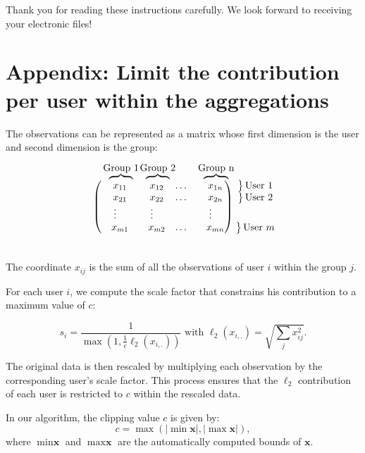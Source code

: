 \documentclass[letterpaper]{article} %
\newcommand\coolover[2]{\mathrlap{\smash{\overbrace{\phantom{%
    \begin{matrix} #2 \end{matrix}}}^{\mbox{$#1$}}}}#2}
\newcommand\coolrightbrace[2]{%
\left.\vphantom{\begin{matrix} #1 \end{matrix}}\right\}#2}
\begin{document}
\bigskip
\noindent Thank you for reading these instructions carefully. We look forward to receiving your electronic files!

% 


\appendix
\section{Appendix: Limit the contribution per user within the aggregations}
\label{sec:limit_contrib_per_user}

The observations can be represented as a matrix whose first dimension is the user
and second dimension is the group:

\[ \vphantom{%
    \begin{matrix}
    \overbrace{XYZ}^{\mbox{$R$}}\\ \\ \\ \\ \\ \\
    \end{matrix}}%
\begin{pmatrix}
    \coolover{\text{Group 1}}{~~~x_{11}} & \coolover{\text{Group 2}}{~~~x_{12}} & \hdots & \coolover{\text{Group n}}{~~~x_{1n}} \\
    ~~~x_{21} & ~~~x_{22} & \hdots & ~~~x_{2n}  \\
    \vdots & \vdots &  & \vdots  \\
    ~~~x_{m1} & ~~~x_{m2} & \hdots & ~~~x_{mn}
\end{pmatrix}%
\begin{matrix}%
    \coolrightbrace{x}{\text{User 1}}\\
    \coolrightbrace{x}{\text{User 2}}\\
    \vphantom{\vdots} \\
    \coolrightbrace{x}{\text{User }m}\\
\end{matrix}
\]

The coordinate $x_{ij}$ is the sum of all the observations of user $i$ within the group $j$.


For each user $i$, we compute the scale factor that constrains his contribution to a maximum value of $c$:

\begin{equation}
	s_i = \frac{1}{\max ( 1, \frac{1}{c} \ell_2(x_{i,.}) )} \text{  with  } \ell_2(x_{i,.}) = \sqrt{\sum_j x^2_{ij}}.
\end{equation}

The original data is then rescaled by multiplying each observation by the corresponding user's scale factor.
This process ensures that the $\ell_2$ contribution of each user is restricted to $c$ within the rescaled data.

In our algorithm, the clipping value $c$ is given by:
\begin{equation}
    c = \max ( |\min \textbf{x}|, |\max \textbf{x}|),
\end{equation}
where $\min \textbf{x}$ and $\max \textbf{x}$ are the automatically computed bounds of $\textbf{x}$.
\end{document}
